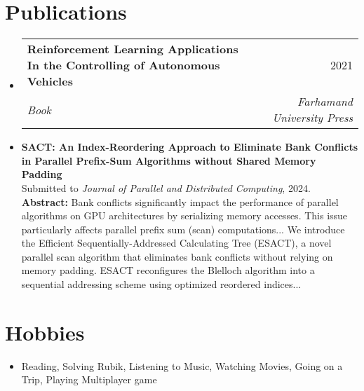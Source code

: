 \documentclass[a4paper,11pt]{article}
\makeatletter
\newcommand{\resumeItem}[1]{
\item{\small{#1}}
}
\newcommand{\resumeItemListStart}{\begin{itemize}[rightmargin=0.11in]}
\newcommand{\resumeItemListEnd}{\end{itemize}}
\newcommand{\resumeQuadHeading}[4]{
\item
\begin{tabular*}{0.96\textwidth}[t]{l@{\extracolsep{\fill}}r}
\textbf{#1} & #2 \\
\textit{\small#3} & \textit{\small #4} \\
\end{tabular*}
}
\newcommand{\resumeHeadingListStart}{
\begin{itemize}[leftmargin=0.15in, label={}]
}
\newcommand{\resumeHeadingListEnd}{\end{itemize}}
\makeatother
\begin{document}
\section{Publications}
\resumeHeadingListStart{}
\resumeQuadHeading{\faBook\hspace{3px} Reinforcement Learning Applications In the Controlling of Autonomous Vehicles}{2021}
{Book}{Farhamand University Press}

\item \textbf{SACT: An Index-Reordering Approach to Eliminate Bank Conflicts in Parallel Prefix-Sum Algorithms without Shared Memory Padding} \\
Submitted to \textit{Journal of Parallel and Distributed Computing}, 2024. \\
\textbf{Abstract:} Bank conflicts significantly impact the performance of parallel algorithms on GPU architectures by serializing memory accesses. This issue particularly affects parallel prefix sum (scan) computations... We introduce the Efficient Sequentially-Addressed Calculating Tree (ESACT), a novel parallel scan algorithm that eliminates bank conflicts without relying on memory padding. ESACT reconfigures the Blelloch algorithm into a sequential addressing scheme using optimized reordered indices...
\resumeHeadingListEnd{}



\section{Hobbies}
\resumeItemListStart{}
\resumeItem{{Reading, Solving Rubik, Listening to Music, Watching Movies, Going on a Trip,  Playing Multiplayer game}}
\resumeItemListEnd{}
\end{document}
